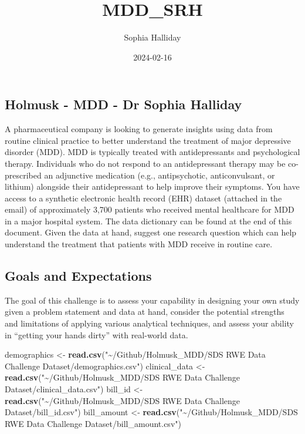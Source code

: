 \documentclass[
]{article}
\title{MDD\_SRH}
\author{Sophia Halliday}
\date{2024-02-16}
\newenvironment{Shaded}{\begin{snugshade}}{\end{snugshade}}
\newcommand{\FunctionTok}[1]{\textcolor[rgb]{0.13,0.29,0.53}{\textbf{#1}}}
\newcommand{\NormalTok}[1]{#1}
\newcommand{\OtherTok}[1]{\textcolor[rgb]{0.56,0.35,0.01}{#1}}
\newcommand{\StringTok}[1]{\textcolor[rgb]{0.31,0.60,0.02}{#1}}
\begin{document}
\maketitle

\hypertarget{holmusk---mdd---dr-sophia-halliday}{%
\subsection{Holmusk - MDD - Dr Sophia
Halliday}\label{holmusk---mdd---dr-sophia-halliday}}

A pharmaceutical company is looking to generate insights using data from
routine clinical practice to better understand the treatment of major
depressive disorder (MDD). MDD is typically treated with antidepressants
and psychological therapy. Individuals who do not respond to an
antidepressant therapy may be co-prescribed an adjunctive medication
(e.g., antipsychotic, anticonvulsant, or lithium) alongside their
antidepressant to help improve their symptoms. You have access to a
synthetic electronic health record (EHR) dataset (attached in the email)
of approximately 3,700 patients who received mental healthcare for MDD
in a major hospital system. The data dictionary can be found at the end
of this document. Given the data at hand, suggest one research question
which can help understand the treatment that patients with MDD receive
in routine care.

\hypertarget{goals-and-expectations}{%
\subsection{Goals and Expectations}\label{goals-and-expectations}}

The goal of this challenge is to assess your capability in designing
your own study given a problem statement and data at hand, consider the
potential strengths and limitations of applying various analytical
techniques, and assess your ability in ``getting your hands dirty'' with
real-world data.

\begin{Shaded}
\begin{Highlighting}[]
\NormalTok{demographics }\OtherTok{\textless{}{-}} \FunctionTok{read.csv}\NormalTok{(}\StringTok{"\textasciitilde{}/Github/Holmusk\_MDD/SDS RWE Data Challenge Dataset/demographics.csv"}\NormalTok{)}
\NormalTok{clinical\_data }\OtherTok{\textless{}{-}} \FunctionTok{read.csv}\NormalTok{(}\StringTok{"\textasciitilde{}/Github/Holmusk\_MDD/SDS RWE Data Challenge Dataset/clinical\_data.csv"}\NormalTok{)}
\NormalTok{bill\_id }\OtherTok{\textless{}{-}} \FunctionTok{read.csv}\NormalTok{(}\StringTok{"\textasciitilde{}/Github/Holmusk\_MDD/SDS RWE Data Challenge Dataset/bill\_id.csv"}\NormalTok{)}
\NormalTok{bill\_amount }\OtherTok{\textless{}{-}} \FunctionTok{read.csv}\NormalTok{(}\StringTok{"\textasciitilde{}/Github/Holmusk\_MDD/SDS RWE Data Challenge Dataset/bill\_amount.csv"}\NormalTok{)}
\end{Highlighting}
\end{Shaded}
\end{document}
